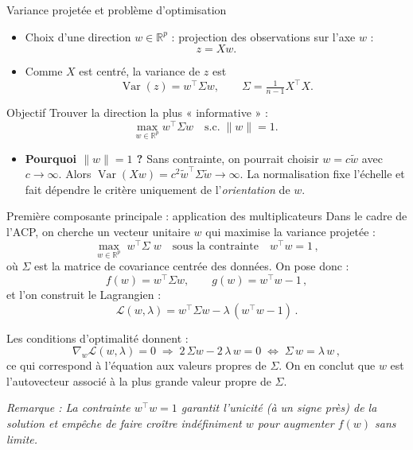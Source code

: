 \documentclass{beamer}
\begin{document}
\begin{frame}{Variance projetée et problème d'optimisation}
\begin{itemize}
  \item Choix d'une direction $w\in\mathbb{R}^{p}$ : projection des observations sur l'axe $w$ :
        \[z = Xw.\]
  \item Comme $X$ est centré, la variance de $z$ est
        \[\operatorname{Var}(z) = w^{\top}\Sigma w,\qquad \Sigma=\tfrac{1}{n-1}X^{\top}X.\]
\end{itemize}

\begin{block}{Objectif}
Trouver la direction la plus « informative » :\\[2pt]
\[
\underset{w\in\mathbb{R}^{p}}{\text{max}}\; w^{\top}\Sigma w
\quad \text{s.c.}\; \|w\|=1.
\]
\end{block}

\begin{itemize}
  \item \textbf{Pourquoi $\|w\|=1$ ?} Sans contrainte, on pourrait choisir $w=c\tilde w$ avec $c\to\infty$. Alors \(\operatorname{Var}(Xw)=c^{2}\tilde w^{\top}\Sigma\tilde w \to \infty\). La normalisation fixe l'échelle et fait dépendre le critère uniquement de l'\emph{orientation} de $w$.
\end{itemize}
\end{frame}

\begin{frame}{Première composante principale : application des multiplicateurs}
Dans le cadre de l'ACP, on cherche un vecteur unitaire $w$ qui maximise la variance projetée :
\[
\max_{w \in \mathbb{R}^p} \; w^\top \Sigma \; w
\quad\text{sous la contrainte}\quad
w^\top w = 1\,,
\]
où $\Sigma$ est la matrice de covariance centrée des données.  On pose donc :
\[ 
f(w) = w^\top \Sigma w, 
\qquad g(w) = w^\top w - 1\,,
\] 
et l'on construit le Lagrangien :
\[
\mathcal{L}(w,\lambda) = w^\top \Sigma w - \lambda\,(w^\top w - 1)\,. 
\]

Les conditions d'optimalité donnent :
\[
\nabla_w \mathcal{L}(w,\lambda) = 0
\;\Longrightarrow\;
2\,\Sigma w - 2\,\lambda\, w = 0
\;\Longleftrightarrow\;
\Sigma\, w = \lambda\, w\,,
\] 
ce qui correspond à l'équation aux valeurs propres de $\Sigma$. On en conclut que $w$ est l'autovecteur associé à la plus grande valeur propre de $\Sigma$.

\textit{Remarque : La contrainte $w^\top w = 1$ garantit l'unicité (à un signe près) de la solution et empêche de faire croître indéfiniment $w$ pour augmenter $f(w)$ sans limite.}
\end{frame}
\end{document}
